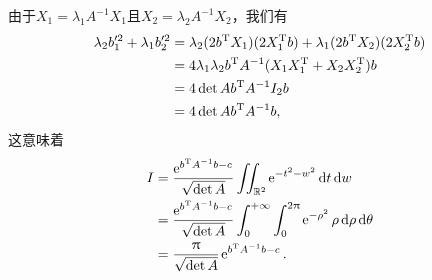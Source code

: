 \begin{solution}
\begin{inparaenum}[(a)]
    由于$X_1=\lambda_1A^{-1}X_1$且$X_2=\lambda_2A^{-1}X_2$，我们有
    \begin{align*}
      \lambda_2b_1'^2 + \lambda_1b_2'^2 & = \lambda_2(2b^{\mathrm T} X_1)(2X_1^{\mathrm T} b) + \lambda_1 (2b^{\mathrm T} X_2)(2X_2^{\mathrm T} b) \\
      & = 4\lambda_1\lambda_2b^{\mathrm T} A^{-1}(X_1X_1^{\mathrm T} + X_2X_2^{\mathrm T}) b \\
      & = 4\det Ab^{\mathrm T} A^{-1}I_2b \\
      & = 4\det Ab^{\mathrm T} A^{-1}b,
    \end{align*}
    这意味着
    \begin{align*}
      I & = \frac{\ee^{b\TT A^{-1}b-c}}{\sqrt{\det A}} \iint_{\MR^2} \ee^{-t^2 - w^2} \dif t \dif w \\
      & = \frac{\ee^{b\TT A^{-1}b-c}}{\sqrt{\det A}} \int_0^{+\infty}\int_0^{2\pi} \ee^{-\rho^2} \rho\dif \rho \dif\theta \\
      & = \frac\pi{\sqrt{\det A}} \ee^{b\TT A^{-1}b-c}.
    \end{align*}
  \end{inparaenum}
\end{solution}



